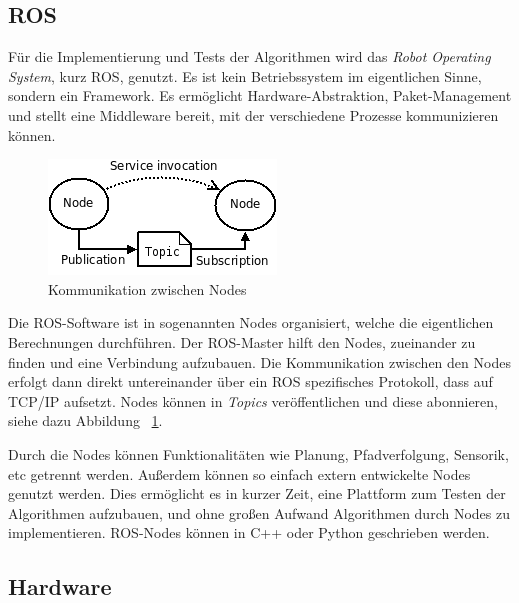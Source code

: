 \documentclass[11pt,a4paper]{article}
\begin{document}
{\subsection{ROS}

	F\"ur die Implementierung und Tests der Algorithmen wird das \textit{Robot Operating System}, kurz ROS, genutzt. Es ist kein Betriebssystem im eigentlichen Sinne, sondern ein Framework. Es erm\"oglicht Hardware-Abstraktion, Paket-Management und stellt eine Middleware bereit, mit der verschiedene Prozesse kommunizieren k\"onnen. \cite{rosWiki}

	\begin{figure}[h]
		\includegraphics[width=\linewidth]{pictures/ROS_basic_concepts.png}
		\caption{Kommunikation zwischen Nodes \label{fig:rosNodes}}
	\end{figure}

	Die ROS-Software ist in sogenannten Nodes organisiert, welche die eigentlichen Berechnungen durchf\"uhren. Der ROS-Master hilft den Nodes, zueinander zu finden und eine Verbindung aufzubauen. Die Kommunikation zwischen den Nodes erfolgt dann direkt untereinander \"uber ein ROS spezifisches Protokoll, dass auf TCP/IP aufsetzt. Nodes k\"onnen in \textit{Topics} ver\"offentlichen und diese abonnieren, siehe dazu Abbildung ~\ref{fig:rosNodes}. \cite{rosConcepts}


	Durch die Nodes k\"onnen Funktionalit\"aten wie Planung, Pfadverfolgung, Sensorik, etc getrennt werden. Au{\ss}erdem k\"onnen so einfach extern entwickelte Nodes genutzt werden. Dies erm\"oglicht es in kurzer Zeit, eine Plattform zum Testen der Algorithmen aufzubauen, und ohne gro{\ss}en Aufwand Algorithmen durch Nodes zu implementieren. ROS-Nodes k\"onnen in C++ oder Python geschrieben werden.

\subsection{Hardware}
 
}
\end{document}
